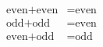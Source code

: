 \documentclass[preview]{standalone}
\begin{document}
\begin{align*}
\begin{aligned}\text{even} + \text{even} &= \text{even} \\\text{odd} + \text{odd} &= \text{even} \\\text{even} + \text{odd} &= \text{odd}\end{aligned}
\end{align*}
\end{document}

